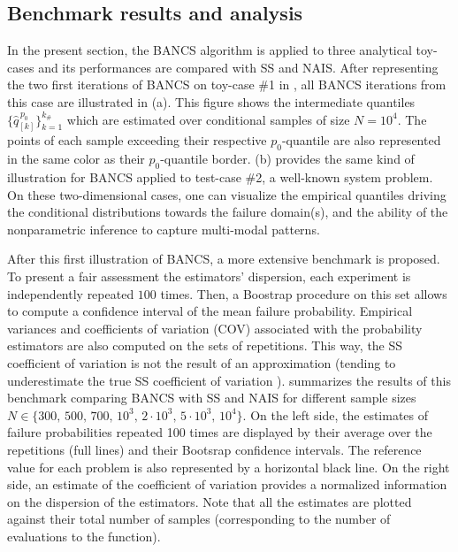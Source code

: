 \subsection{Benchmark results and analysis}

In the present section, the BANCS algorithm is applied to three analytical toy-cases and its performances are compared with SS and NAIS. 
After representing the two first iterations of BANCS on toy-case \#1 in , all BANCS iterations from this case are illustrated in  (a). 
This figure shows the intermediate quantiles $\{\widehat{q}_{[k]}^{\, p_0}\}_{k=1}^{k_\#}$ which are estimated over conditional samples of size $N=10^4$. 
The points of each sample exceeding their respective $p_0$-quantile are also represented in the same color as their $p_0$-quantile border. 
 (b) provides the same kind of illustration for BANCS applied to test-case \#2, a well-known system problem. 
On these two-dimensional cases, one can visualize the empirical quantiles driving the conditional distributions towards the failure domain(s), and the ability of the nonparametric inference to capture multi-modal patterns.  

After this first illustration of BANCS, a more extensive benchmark is proposed. 
To present a fair assessment the estimators' dispersion, each experiment is independently repeated $100$ times. 
Then, a Boostrap procedure on this set allows to compute a confidence interval of the mean failure probability. 
Empirical variances and coefficients of variation (COV) associated with the probability estimators are also computed on the sets of repetitions. 
This way, the SS coefficient of variation is not the result of an approximation (tending to underestimate the true SS coefficient of variation \citealp{Papaioannou_PEM_2015}).
 summarizes the results of this benchmark comparing BANCS with SS and NAIS for different sample sizes $N \in \{300,\, 500,\, 700,\, 10^3,\, 2\cdot10^3,\, 5\cdot10^3,\, 10^4\}$.  
On the left side, the estimates of failure probabilities repeated 100 times are displayed by their average over the repetitions (full lines) and their Bootsrap confidence intervals. 
The reference value for each problem is also represented by a horizontal black line. 
On the right side, an estimate of the coefficient of variation provides a normalized information on the dispersion of the estimators.  
Note that all the estimates are plotted against their total number of samples (corresponding to the number of evaluations to the function). 

